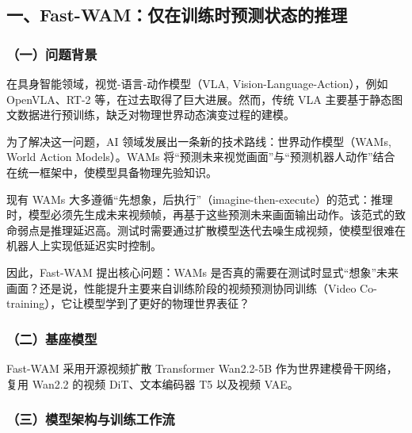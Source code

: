 \hypertarget{ux4e00fast-wamux4ec5ux5728ux8badux7ec3ux65f6ux9884ux6d4bux72b6ux6001ux7684ux63a8ux7406}{%
\subsection{一、Fast-WAM：仅在训练时预测状态的推理}\label{ux4e00fast-wamux4ec5ux5728ux8badux7ec3ux65f6ux9884ux6d4bux72b6ux6001ux7684ux63a8ux7406}}

\hypertarget{ux4e00ux95eeux9898ux80ccux666f-21}{%
\subsubsection{（一）问题背景}\label{ux4e00ux95eeux9898ux80ccux666f-21}}

在具身智能领域，视觉-语言-动作模型（VLA, Vision-Language-Action），例如 OpenVLA、RT-2 等，在过去取得了巨大进展。然而，传统 VLA 主要基于静态图文数据进行预训练，缺乏对物理世界动态演变过程的建模。

为了解决这一问题，AI 领域发展出一条新的技术路线：世界动作模型（WAMs, World Action Models）。WAMs 将``预测未来视觉画面''与``预测机器人动作''结合在统一框架中，使模型具备物理先验知识。

现有 WAMs 大多遵循``先想象，后执行''（imagine-then-execute）的范式：推理时，模型必须先生成未来视频帧，再基于这些预测未来画面输出动作。该范式的致命弱点是推理延迟高。测试时需要通过扩散模型迭代去噪生成视频，使模型很难在机器人上实现低延迟实时控制。

因此，Fast-WAM 提出核心问题：WAMs 是否真的需要在测试时显式``想象''未来画面？还是说，性能提升主要来自训练阶段的视频预测协同训练（Video Co-training），它让模型学到了更好的物理世界表征？

\hypertarget{ux4e8cux57faux5ea7ux6a21ux578b}{%
\subsubsection{（二）基座模型}\label{ux4e8cux57faux5ea7ux6a21ux578b}}

Fast-WAM 采用开源视频扩散 Transformer Wan2.2-5B 作为世界建模骨干网络，复用 Wan2.2 的视频 DiT、文本编码器 T5 以及视频 VAE。

\hypertarget{ux4e09ux6a21ux578bux67b6ux6784ux4e0eux8badux7ec3ux5de5ux4f5cux6d41}{%
\subsubsection{（三）模型架构与训练工作流}\label{ux4e09ux6a21ux578bux67b6ux6784ux4e0eux8badux7ec3ux5de5ux4f5cux6d41}}

